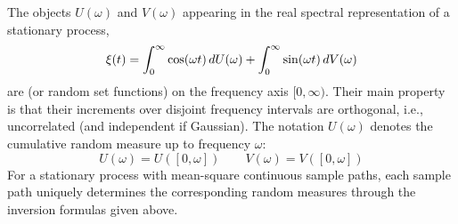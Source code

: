 \documentclass{article}
\newcommand{\tmtextit}[1]{\text{{\itshape{#1}}}}
\begin{document}
\begin{remark}
  The objects $U (\omega)$ and $V (\omega)$ appearing in the real spectral
  representation of a stationary process,
  \begin{equation}
    \xi (t) = \int_0^{\infty} \cos (\omega t)  \hspace{0.17em} dU (\omega) +
    \int_0^{\infty} \sin (\omega t)  \hspace{0.17em} dV (\omega)
  \end{equation}
  are \tmtextit{random measures} (or random set functions) on the frequency
  axis $[0, \infty)$. Their main property is that their increments over
  disjoint frequency intervals are orthogonal, i.e., uncorrelated (and
  independent if Gaussian). The notation $U (\omega)$ denotes the cumulative
  random measure up to frequency $\omega$:
  \begin{equation}
    U (\omega) = U ([0, \omega])  \qquad V (\omega) = V ([0, \omega])
  \end{equation}
  For a stationary process with mean-square continuous sample paths, each
  sample path uniquely determines the corresponding random measures through
  the inversion formulas given above.
\end{remark}
\end{document}
